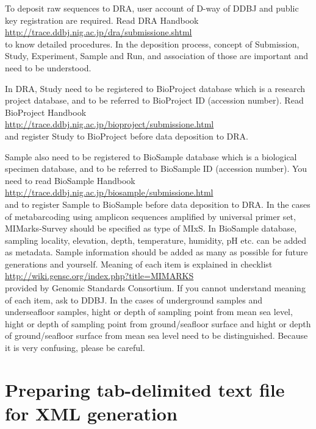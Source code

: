\documentclass[titlepage,10pt,a4paper,english]{jsbook}
\begin{document}
To deposit raw sequences to DRA, user account of D-way of DDBJ and public key registration are required.
Read DRA Handbook\\
\href{http://trace.ddbj.nig.ac.jp/dra/submission_e.shtml}{http://trace.ddbj.nig.ac.jp/dra/submission{\textunderscore}e.shtml}\\
to know detailed procedures.
In the deposition process, concept of Submission, Study, Experiment, Sample and Run, and association of those are important and need to be understood.

In DRA, Study need to be registered to BioProject database which is a research project database, and to be referred to BioProject ID (accession number).
Read BioProject Handbook\\
\href{http://trace.ddbj.nig.ac.jp/bioproject/submission_e.html}{http://trace.ddbj.nig.ac.jp/bioproject/submission{\textunderscore}e.html}\\
and register Study to BioProject before data deposition to DRA.

Sample also need to be registered to BioSample database which is a biological specimen database, and to be referred to BioSample ID (accession number).
You need to read BioSample Handbook\\
\href{http://trace.ddbj.nig.ac.jp/biosample/submission_e.html}{http://trace.ddbj.nig.ac.jp/biosample/submission{\textunderscore}e.html}\\
and to register Sample to BioSample before data deposition to DRA.
In the cases of metabarcoding using amplicon sequences amplified by universal primer set, MIMarks-Survey should be specified as type of MIxS.
In BioSample database, sampling locality, elevation, depth, temperature, humidity, pH etc. can be added as metadata.
Sample information should be added as many as possible for future generations and yourself.
Meaning of each item is explained in checklist\\
\href{http://wiki.gensc.org/index.php?title=MIMARKS}{http://wiki.gensc.org/index.php?title=MIMARKS}\\
provided by Genomic Standards Consortium.
If you cannot understand meaning of each item, ask to DDBJ.
In the cases of underground samples and underseafloor samples, hight or depth of sampling point from mean sea level, hight or depth of sampling point from ground/seafloor surface and hight or depth of ground/seafloor surface from mean sea level need to be distinguished.
Because it is very confusing, please be careful.

\section{Preparing tab-delimited text file for XML generation}
\end{document}

